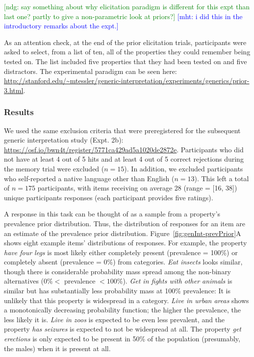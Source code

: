 \documentclass[,man,floatsintext]{apa6}
\theoremstyle{definition}
\theoremstyle{definition}
\theoremstyle{definition}
\theoremstyle{remark}
\begin{document}
{\textcolor{Green}{[ndg: say something about why elicitation paradigm is different for this expt than last one? partly to give a non-parametric look at priors?]}}
{\textcolor{Blue}{[mht: i did this in the introductory remarks about the expt.]}}

As an attention check, at the end of the prior elicitation trials,
participants were asked to select, from a list of ten, all of the
properties they could remember being tested on. The list included five
properties that they had been tested on and five distractors. The
experimental paradigm can be seen here:
\url{http://stanford.edu/~mtessler/generic-interpretation/experiments/generics/prior-3.html}.

\hypertarget{results-1}{%
\subsubsection{Results}\label{results-1}}

We used the same exclusion criteria that were preregistered for the
subsequent generic interpretation study (Expt. 2b):
\url{https://osf.io/bwn4t/register/5771ca429ad5a1020de2872e}.
Participants who did not have at least 4 out of 5 hits and at least 4
out of 5 correct rejections during the memory trial were excluded
(\(n = 15\)). In addition, we excluded participants who self-reported a
native language other than English (\(n = 13\)). This left a total of
\(n = 175\) participants, with items receiving on average 28 (range =
{[}16, 38{]}) unique participants responses (each participant provides
five ratings).

A response in this task can be thought of as a sample from a property's
prevalence prior distribution. Thus, the distribution of responses for
an item are an estimate of the prevalence prior distribution.
Figure~\ref{fig:genInt-prevPrior}A shows eight example items'
distributions of responses. For example, the property \emph{have four
legs} is most likely either completely present (prevalence = 100\%) or
completely absent (prevalence = 0\%) from categories. \emph{Eat insects}
looks similar, though there is considerable probability mass spread
among the non-binary alternatives (\(0\% <\) prevalence \(< 100\%\)).
\emph{Get in fights with other animals} is similar but has substantially
less probability mass at 100\% prevalence: It is unlikely that this
property is widespread in a category. \emph{Live in urban areas} shows a
monotonically decreasing probability function; the higher the
prevalence, the less likely it is. \emph{Live in zoos} is expected to be
even less prevalent, and the property \emph{has seizures} is expected to
not be widespread at all. The property \emph{get erections} is only
expected to be present in 50\% of the population (presumably, the males)
when it is present at all.
\end{document}
